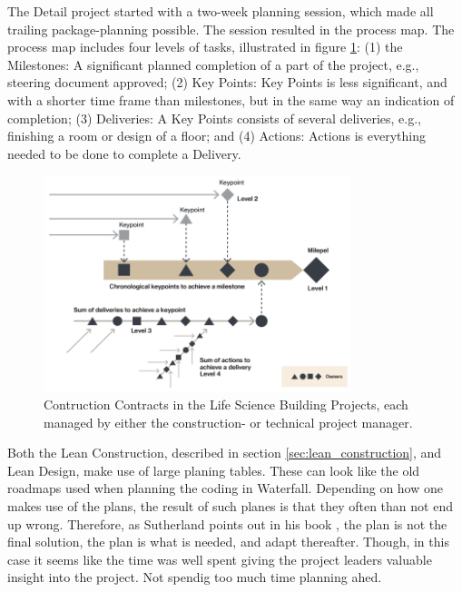 The Detail project started with a two-week planning session, which made all trailing package-planning possible. The session resulted in the process map. The process map includes four levels of tasks, illustrated in figure \ref{fig:Milestones-Keypoints-Deliveries-Actions}: (1) the Milestones: A significant planned completion of a part of the project, e.g., steering document approved; (2) Key Points: Key Points is less significant, and with a shorter time frame than milestones, but in the same way an indication of completion; (3) Deliveries: A Key Points consists of several deliveries, e.g., finishing a room or design of a floor; and (4) Actions: Actions is everything needed to be done to complete a Delivery. 

\begin{figure}
    \centering
    \includegraphics[width=0.8\textwidth]{fig/LSB_task_levels.png}
    \caption{Contruction Contracts in the Life Science Building Projects, each managed by either the construction- or technical project manager.}
    \label{fig:Milestones-Keypoints-Deliveries-Actions}
\end{figure}

Both the Lean Construction, described in section \ref{sec:lean_construction}, and Lean Design, make use of large planing tables. These can look like the old roadmaps used when planning the coding in Waterfall. Depending on how one makes use of the plans, the result of such planes is that they often than not end up wrong. Therefore, as Sutherland points out in his book \cite{sutherland}, the plan is not the final solution, the plan is what is needed, and adapt thereafter. Though, in this case it seems like the time was well spent giving the project leaders valuable insight into the project. Not spendig too much time planning ahed. 

